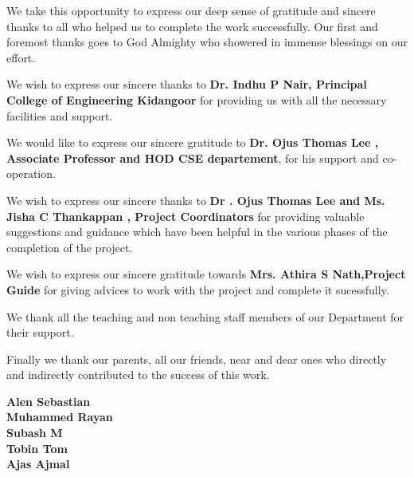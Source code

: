 \documentclass[twoside,a4paper,openright]{report} %
\begin{document}
We take this opportunity to express our deep sense of gratitude and sincere thanks to all who helped us to complete the work successfully. Our first and foremost thanks goes to God Almighty who showered in immense blessings on our effort.

 We wish to express our sincere thanks to \textbf{Dr. Indhu P Nair, Principal College of Engineering Kidangoor} for providing  us with all the necessary facilities and support.
 
 We would like to express our sincere gratitude to \textbf{Dr. Ojus Thomas Lee , Associate Professor and HOD CSE departement}, for his support and co-operation.

 We wish to express our sincere thanks to  \textbf{Dr . Ojus Thomas Lee and Ms. Jisha C Thankappan , Project Coordinators } for providing valuable suggestions and guidance which have been helpful in the various phases of the completion of the project.
 
 We wish to express our sincere gratitude towards \textbf{ Mrs. Athira S Nath,Project Guide } for giving advices to work with the project and complete it sucessfully.
 
 We thank all the teaching and non teaching staff members of our Department for their support.
 
  
 Finally we thank our parents, all our friends, near and dear ones who directly and indirectly contributed to the success of this work.

\begin{flushright}                                      
                       
\textbf{ Alen Sebastian\\
Muhammed Rayan  \\
Subash M    \\
Tobin Tom  \\
Ajas Ajmal      
} 
\end{flushright} 


\thispagestyle{empty}
\newpage
\mbox{~}
\newpage
\end{document}
